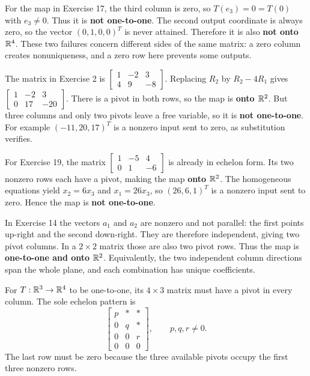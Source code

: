 For the map in Exercise 17, the third column is zero, so
$T(e_3)=0=T(0)$ with $e_3\ne0$. Thus it is \textbf{not one-to-one}.
The second output coordinate is always zero, so the vector
$(0,1,0,0)^T$ is never attained. Therefore it is also \textbf{not onto $\mathbb{R}^4$}.
These two failures concern different sides of the same matrix: a zero
column creates nonuniqueness, and a zero row here prevents some outputs.

The matrix in Exercise 2 is
$\begin{bmatrix}1&-2&3\\4&9&-8\end{bmatrix}$.
Replacing $R_2$ by $R_2-4R_1$ gives
$\begin{bmatrix}1&-2&3\\0&17&-20\end{bmatrix}$.
There is a pivot in both rows, so the map is \textbf{onto $\mathbb{R}^2$}.
But three columns and only two pivots leave a free variable, so it
is \textbf{not one-to-one}. For example $(-11,20,17)^T$ is a nonzero
input sent to zero, as substitution verifies.

For Exercise 19, the matrix
$\begin{bmatrix}1&-5&4\\0&1&-6\end{bmatrix}$ is already in echelon form.
Its two nonzero rows each have a pivot, making the map \textbf{onto $\mathbb{R}^2$}.
The homogeneous equations yield $x_2=6x_3$ and $x_1=26x_3$,
so $(26,6,1)^T$ is a nonzero input sent to zero. Hence the map is
\textbf{not one-to-one}.

In Exercise 14 the vectors $a_1$ and $a_2$ are nonzero and not
parallel: the first points up-right and the second down-right.
They are therefore independent, giving two pivot columns. In a
$2\times2$ matrix those are also two pivot rows. Thus the map is
\textbf{one-to-one and onto $\mathbb{R}^2$}. Equivalently, the two independent
column directions span the whole plane, and each combination has
unique coefficients.

For $T:\mathbb{R}^3\to\mathbb{R}^4$ to be one-to-one, its $4\times3$ matrix
must have a pivot in every column. The sole echelon pattern is
\[
 \begin{bmatrix}p&*&*\\0&q&*\\0&0&r\\0&0&0\end{bmatrix},
 \qquad p,q,r\ne0.
\]
The last row must be zero because the three available pivots occupy
the first three nonzero rows.

